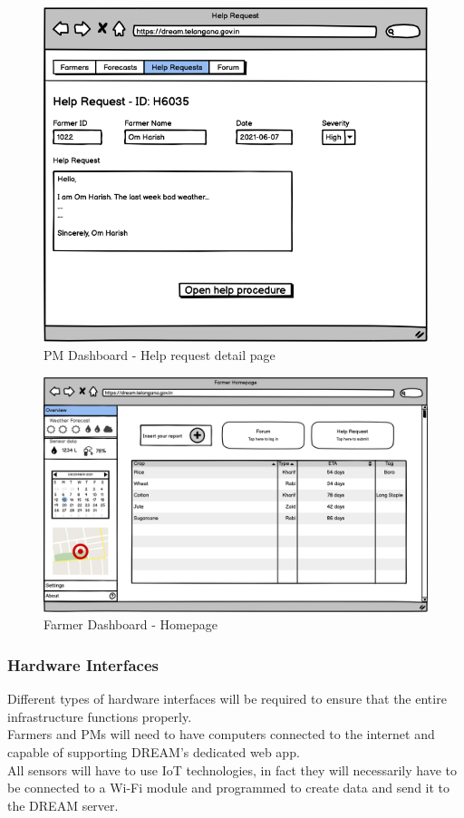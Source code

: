 \documentclass[10pt]{article}
\begin{document}
\begin{figure}[ht!]
    \centering
    \includegraphics[scale=0.40]{ui/pm_helpdetail.png}
    \caption{PM Dashboard - Help request detail page}
\end{figure}
\begin{figure}[ht!]
    \centering
    \includegraphics[scale=0.15]{ui/f_homepage.png}
    \caption{Farmer Dashboard - Homepage}
\end{figure}
\newpage
\subsubsection{Hardware Interfaces}
Different types of hardware interfaces will be required to ensure that the entire infrastructure functions properly.\\
Farmers and PMs will need to have computers connected to the internet and capable of supporting DREAM's dedicated web app.\\
All sensors will have to use IoT technologies\cite{irrigation}, in fact they will necessarily have to be connected to a Wi-Fi module and programmed to create data and send it to the DREAM server. 
\end{document}
